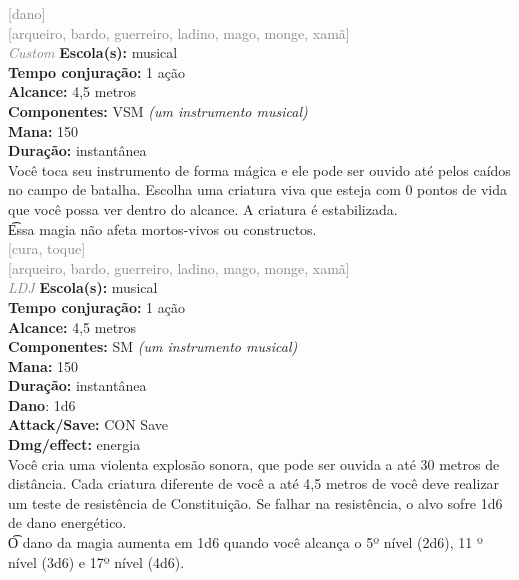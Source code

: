 \documentclass{RPG_Adventure}[2021/10/20]
\begin{document}
{\scriptsize \textcolor{gray}{[dano]\\}}
{\scriptsize \textcolor{gray}{[arqueiro, bardo, guerreiro, ladino, mago, monge, xamã]\\}}
{\tiny \textcolor{gray}{\textit{Custom}}}\jump{}
{\small \t \textbf{Escola(s):} musical\\\t \textbf{Tempo conjuração:} 1 ação\\\t \textbf{Alcance:} 4,5 metros\\\t \textbf{Componentes:} VSM \textit{(um instrumento musical)}\\\t \textbf{Mana:} 150\\\t \textbf{Duração:} instantânea\\}
{\normalsize Você toca seu instrumento de forma mágica e ele pode ser ouvido até pelos caídos no campo de batalha. Escolha uma criatura viva que esteja com 0 pontos de vida que você possa ver dentro do alcance. A criatura é estabilizada.\\\t Essa magia não afeta mortos-vivos ou constructos.\\}
{\scriptsize \textcolor{gray}{[cura, toque]\\}}
{\scriptsize \textcolor{gray}{[arqueiro, bardo, guerreiro, ladino, mago, monge, xamã]\\}}
{\tiny \textcolor{gray}{\textit{LDJ}}}\jump{}
{\small \t \textbf{Escola(s):} musical\\\t \textbf{Tempo conjuração:} 1 ação\\\t \textbf{Alcance:} 4,5 metros\\\t \textbf{Componentes:} SM \textit{(um instrumento musical)}\\\t \textbf{Mana:} 150\\\t \textbf{Duração:} instantânea\\\t \textbf{Dano}: 1d6\\\t \textbf{Attack/Save:} CON Save\\\t \textbf{Dmg/effect:} energia\\}
{\normalsize Você cria uma violenta explosão sonora, que pode ser ouvida a até 30 metros de distância. Cada criatura diferente de você a até 4,5 metros de você deve realizar um teste de resistência de Constituição. Se falhar na resistência, o alvo sofre 1d6 de dano energético.\\\t O dano da magia aumenta em 1d6 quando você alcança o 5º nível (2d6), 11 º nível (3d6) e 17º nível (4d6).\\}
\end{document}
